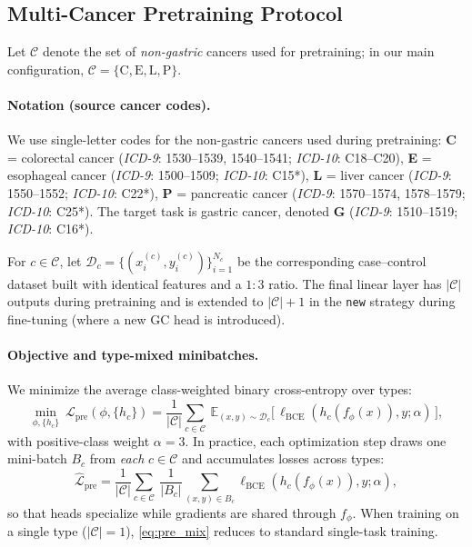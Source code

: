 \documentclass[journal,article,submit,pdftex,moreauthors]{Definitions/mdpi}
\begin{document}
\subsection{Multi-Cancer Pretraining Protocol}\label{sec:pretrain_multi}

Let $\mathcal{C}$ denote the set of \emph{non-gastric} cancers used for pretraining; in our main configuration, $\mathcal{C}=\{\mathrm{C},\mathrm{E},\mathrm{L},\mathrm{P}\}$. 
\paragraph{Notation (source cancer codes).}
We use single-letter codes for the non-gastric cancers used during pretraining:
\textbf{C} = colorectal cancer (\emph{ICD-9}: 1530--1539, 1540--1541; \emph{ICD-10}: C18--C20),
\textbf{E} = esophageal cancer (\emph{ICD-9}: 1500--1509; \emph{ICD-10}: C15*),
\textbf{L} = liver cancer (\emph{ICD-9}: 1550--1552; \emph{ICD-10}: C22*),
\textbf{P} = pancreatic cancer (\emph{ICD-9}: 1570--1574, 1578--1579; \emph{ICD-10}: C25*).
The target task is gastric cancer, denoted \textbf{G} (\emph{ICD-9}: 1510--1519; \emph{ICD-10}: C16*).

For $c\in\mathcal{C}$, let $\mathcal{D}_c=\{(x_i^{(c)},y_i^{(c)})\}_{i=1}^{N_c}$ be the corresponding case--control dataset built with identical features and a $1{:}3$ ratio. The final linear layer has $|\mathcal{C}|$ outputs during pretraining and is extended to $|\mathcal{C}|{+}1$ in the \texttt{new} strategy during fine-tuning (where a new GC head is introduced).

\paragraph{Objective and type-mixed minibatches.}
We minimize the average class-weighted binary cross-entropy over types:
\begin{equation}
\label{eq:pre_obj}
\min_{\phi,\{h_c\}}\ \mathcal{L}_{\mathrm{pre}}(\phi,\{h_c\})=\frac{1}{|\mathcal{C}|}\sum_{c\in\mathcal{C}} \ \mathbb{E}_{(x,y)\sim\mathcal{D}_c}\!\big[\,\ell_{\mathrm{BCE}}(h_c(f_\phi(x)),y;\alpha)\,\big],
\end{equation}
with positive-class weight $\alpha{=}3$. In practice, each optimization step draws one mini-batch $B_c$ from \emph{each} $c\in\mathcal{C}$ and accumulates losses across types:
\begin{equation}
\label{eq:pre_mix}
\hat{\mathcal{L}}_{\mathrm{pre}}=\frac{1}{|\mathcal{C}|}\sum_{c\in\mathcal{C}}\ \frac{1}{|B_c|}\sum_{(x,y)\in B_c}\ell_{\mathrm{BCE}}(h_c(f_\phi(x)),y;\alpha),
\end{equation}
so that heads specialize while gradients are shared through $f_\phi$. When training on a single type ($|\mathcal{C}|{=}1$), \eqref{eq:pre_mix} reduces to standard single-task training.
\end{document}
